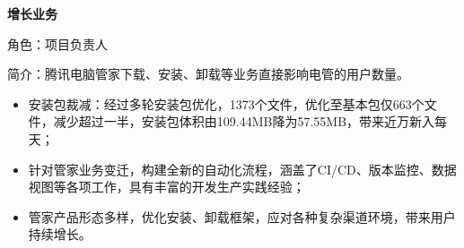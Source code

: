 \documentclass{resume}
\begin{document}
\vspace{2.0ex}
{\textbf{\large{增长业务}}}
\vspace{0.5ex}
\par{角色：项目负责人}
\par{简介：腾讯电脑管家下载、安装、卸载等业务直接影响电管的用户数量。}
\begin{itemize}
  \item 安装包裁减：经过多轮安装包优化，1373个文件，优化至基本包仅663个文件，减少超过一半，安装包体积由109.44MB降为57.55MB，带来近万新入每天；
  \item 针对管家业务变迁，构建全新的自动化流程，涵盖了CI/CD、版本监控、数据视图等各项工作，具有丰富的开发生产实践经验；
  \item 管家产品形态多样，优化安装、卸载框架，应对各种复杂渠道环境，带来用户持续增长。
\end{itemize}



\end{document}
